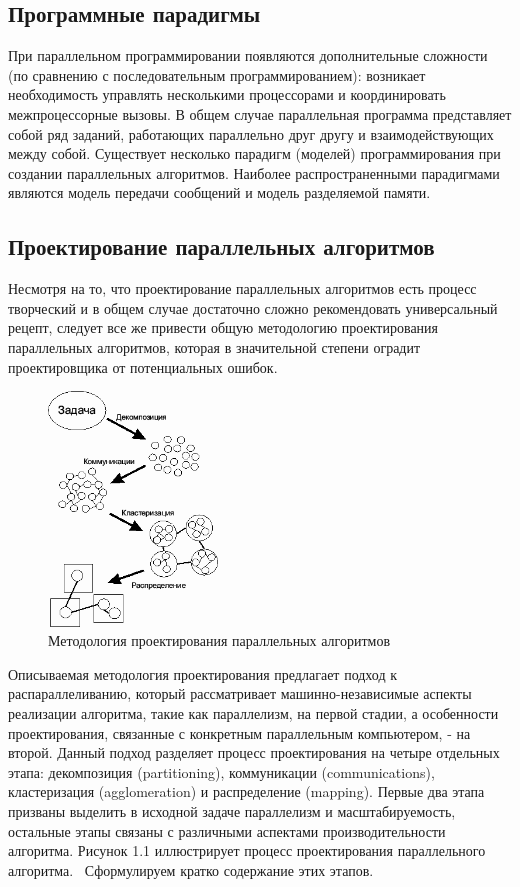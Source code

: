 \subsection{Программные парадигмы}

При параллельном программировании появляются дополнительные сложности (по сравнению с последовательным программированием): возникает необходимость управлять несколькими процессорами и координировать межпроцессорные вызовы. В общем случае параллельная программа представляет собой ряд заданий, работающих параллельно друг другу и взаимодействующих между собой. Существует несколько парадигм (моделей) программирования при создании параллельных алгоритмов. Наиболее распространенными парадигмами являются модель передачи сообщений и модель разделяемой памяти.


\subsection{Проектирование параллельных алгоритмов}
Несмотря на то, что проектирование параллельных алгоритмов есть процесс творческий и в общем случае достаточно сложно рекомендовать универсальный рецепт, следует все же привести общую методологию проектирования параллельных алгоритмов, которая в значительной степени оградит проектировщика от потенциальных ошибок.

\begin{figure}[h!]
	\centering
	\includegraphics[width=0.4\textwidth]{img/img1.png}
	\caption{Методология проектирования параллельных алгоритмов}
	\label{fig:spire05}
\end{figure}

Описываемая методология проектирования предлагает подход к распараллеливанию, который рассматривает машинно-независимые аспекты реализации алгоритма, такие как параллелизм, на первой стадии, а особенности проектирования, связанные с конкретным параллельным компьютером, - на второй. Данный подход разделяет процесс проектирования на четыре отдельных этапа: декомпозиция (partitioning), коммуникации (communications), кластеризация (agglomeration) и распределение (mapping). Первые два этапа призваны выделить в исходной задаче параллелизм и масштабируемость, остальные этапы связаны с различными аспектами производительности алгоритма\cite{test1_B}. Рисунок 1.1 иллюстрирует процесс проектирования параллельного алгоритма.  
Сформулируем кратко содержание этих этапов. 
